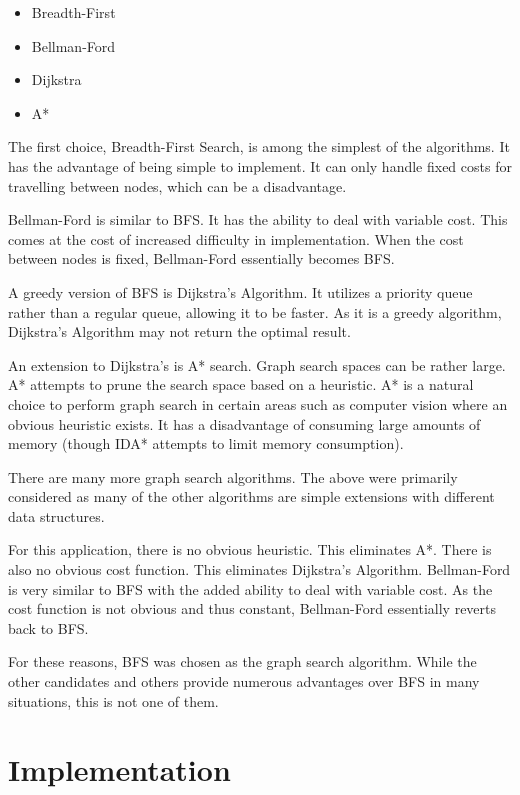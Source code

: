 \documentclass[12pt,letterpaper,oneside]{report}
\theoremstyle{definition}
\begin{document}
			\begin{itemize}
				\item Breadth-First
				\item Bellman-Ford
				\item Dijkstra
				\item A*
			\end{itemize}
			
			The first choice, Breadth-First Search, is among the simplest of the algorithms.  It has the advantage of being simple to implement.  It can only handle fixed costs for travelling between nodes, which can be a disadvantage.
			
			Bellman-Ford is similar to BFS.  It has the ability to deal with variable cost.  This comes at the cost of increased difficulty in implementation.  When the cost between nodes is fixed, Bellman-Ford essentially becomes BFS.
			
			A greedy version of BFS is Dijkstra's Algorithm.  It utilizes a priority queue rather than a regular queue, allowing it to be faster.  As it is a greedy algorithm, Dijkstra's Algorithm may not return the optimal result.
			
			An extension to Dijkstra's is A* search.  Graph search spaces can be rather large.  A* attempts to prune the search space based on a heuristic.  A* is a natural choice to perform graph search in certain areas such as computer vision where an obvious heuristic exists.  It has a disadvantage of consuming large amounts of memory (though IDA* attempts to limit memory consumption).
			
			There are many more graph search algorithms.  The above were primarily considered as many of the other algorithms are simple extensions with different data structures.
			
			For this application, there is no obvious heuristic.  This eliminates A*.  There is also no obvious cost function.  This eliminates Dijkstra's Algorithm.  Bellman-Ford is very similar to BFS with the added ability to deal with variable cost.  As the cost function is not obvious and thus constant, Bellman-Ford essentially reverts back to BFS.
			
			For these reasons, BFS was chosen as the graph search algorithm.  While the other candidates and others provide numerous advantages over BFS in many situations, this is not one of them.
	
	\chapter{Implementation}
\end{document}
